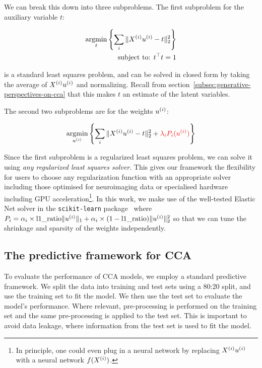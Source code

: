 We can break this down into three subproblems.
The first subproblem for the auxiliary variable \(t\):

\begin{align}
    \underset{t}{\mathrm{argmin}}\left\{\sum_i \|X^{(i)} u^{(i)} - t\|_2^2\right\}\\
    \text{subject to: }t^\top t = 1\\
\end{align}

is a standard least squares problem, and can be solved in closed form by taking the average of $X^{(i)} u^{(i)}$ and normalizing.
Recall from section~\ref{subsec:generative-perspectives-on-cca} that this makes $t$ an estimate of the latent variables.

The second two subproblems are for the weights \(u^{(i)}\):

\begin{align}
    \underset{u^{(i)}}{\mathrm{argmin}}\left\{\sum_i \|X^{(i)} u^{(i)} - t\|_2^2 + \textcolor{red}{\lambda_i P_i(u^{(i)})} \right\}\\
\end{align}

Since the first subproblem is a regularized least squares problem, we can solve it using \textit{any regularized least squares solver}.
This gives our framework the flexibility for users to choose any regularization function with an appropriate solver including those optimised for neuroimaging data\citep{Nilearn_contributors_Nilearn} or specialised hardware including GPU acceleration\footnote{In principle, one could even plug in a neural network by replacing $X^{(i)} u^{(i)}$ with a neural network $f(X^{(i)})$.}.
In this work, we make use of the well-tested Elastic Net solver in the \texttt{scikit-learn} package~\citep{pedregosa2011scikit} where $P_i=\alpha_i \times \text{l1\_ratio} \|u^{(i)}\|_1 + \alpha_i \times (1-\text{l1\_ratio}) \|u^{(i)}\|^2_2$ so that we can tune the shrinkage and sparsity of the weights independently.

\subsection{The predictive framework for CCA}\label{subsec:the-predictive-framework-for-cca}

To evaluate the performance of CCA models, we employ a standard predictive framework.
We split the data into training and test sets using a 80:20 split, and use the training set to fit the model.
We then use the test set to evaluate the model's performance.
Where relevant, pre-processing is performed on the training set and the same pre-processing is applied to the test set.
This is important to avoid data leakage, where information from the test set is used to fit the model.

